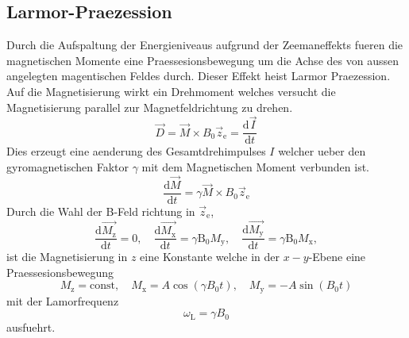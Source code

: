 \subsection{Larmor-Praezession}%
\label{sub:larmor_praezession}
Durch die Aufspaltung der Energieniveaus aufgrund der Zeemaneffekts fueren
die magnetischen Momente eine Praessesionsbewegung um die Achse des von aussen
angelegten magentischen Feldes durch. 
Dieser Effekt heist Larmor Praezession. 
Auf die Magnetisierung wirkt ein Drehmoment welches versucht die Magnetisierung
parallel zur Magnetfeldrichtung zu drehen.
\begin{equation}
		\label{eq:dreh}
		\vec{D} = \vec{M} \times B_0 \vec{z}_\text{e} = \frac{\text{d} \vec{I}}{\text{d}t} 
\end{equation}
Dies erzeugt eine aenderung des Gesamtdrehimpulses $I$ welcher ueber den
gyromagnetischen Faktor $\gamma$ mit dem Magnetischen Moment verbunden ist.
\begin{equation}
		\label{eq:dreh}
		\frac{\text{d} \vec{M}}{\text{d}t} = \gamma \vec{M} \times B_0
		\vec{z}_\text{e}
\end{equation}
Durch die Wahl der B-Feld richtung in $\vec{z}_\text{e}$,
\begin{equation}
		\label{eq:ablM}
		\frac{\text{d} \vec{M_\text{z}}}{\text{d}t} = 0 ,  \hspace{1em}
		\frac{\text{d} \vec{M_\text{x}}}{\text{d}t} = \gamma \text{B}_0
		M_\text{y}, \hspace{1em}
		\frac{\text{d} \vec{M_\text{y}}}{\text{d}t} = \gamma \text{B}_0
		M_\text{x}, 
\end{equation}
 ist die Magnetisierung in $z$ eine Konstante welche in der $x-y$-Ebene
 eine Praessesionsbewegung 
\begin{equation}
		\label{eq:schwM}
		M_\text{z} = \text{const}, \hspace{1em} M_\text{x} = A \cos(\gamma B_0
		t ), \hspace{1em} M_\text{y} = -A \sin(B_0 t)
\end{equation}
mit der Lamorfrequenz
\begin{equation}
		\label{eq:larmorf}
		\omega_\text{L} = \gamma B_0
\end{equation}
ausfuehrt. 

